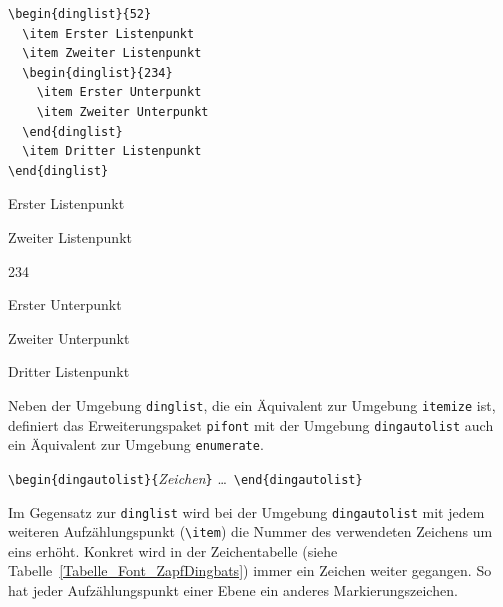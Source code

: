 \documentclass[a4paper,10pt,twoside]{scrbook}
\begin{document}
{%
\begin{minipage}[h]{0.5\textwidth}
\setlength{\parskip}{1em}
\frenchspacing
\begin{Verbatim}[frame=single]
\begin{dinglist}{52}
  \item Erster Listenpunkt
  \item Zweiter Listenpunkt
  \begin{dinglist}{234}
    \item Erster Unterpunkt
    \item Zweiter Unterpunkt
  \end{dinglist}
  \item Dritter Listenpunkt
\end{dinglist}
\end{Verbatim}
\end{minipage}
\hfill
\begin{minipage}[h]{0.48\textwidth}
\setlength{\parskip}{1em}
\frenchspacing
\begin{dinglist}{52}
  \item Erster Listenpunkt
  \item Zweiter Listenpunkt
  \begin{dinglist}{234}
    \item Erster Unterpunkt
    \item Zweiter Unterpunkt
  \end{dinglist}
  \item Dritter Listenpunkt
\end{dinglist}
\end{minipage}

Neben der Umgebung \verb!dinglist!, die ein Äquivalent zur Umgebung \verb!itemize! ist, definiert
das Erweiterungspaket \verb!pifont! mit der Umgebung \verb!dingautolist! auch ein Äquivalent zur 
Umgebung \verb!enumerate!.



\begin{boxedminipage}{\textwidth}
\texttt{\textbackslash begin\{dingautolist\}\{}\textsl{Zeichen}\texttt{\}}  \enskip \dots\ \enskip \texttt{\textbackslash end\{dingautolist\}} 
\end{boxedminipage}


Im Gegensatz zur \verb!dinglist! wird bei der Umgebung \verb!dingautolist!
mit jedem weiteren Aufzählungspunkt 
(\verb!\item!) die Nummer des verwendeten Zeichens um eins erhöht. 
Konkret wird in der Zeichentabelle (siehe Tabelle~\ref{Tabelle_Font_ZapfDingbats}) 
immer ein Zeichen weiter gegangen. So hat jeder Aufzählungspunkt einer Ebene ein anderes
Markierungszeichen.


}
\end{document}
